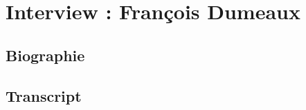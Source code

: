 \chapter{Interview : François Dumeaux}
\label{appendix:dumeaux}

\section*{Biographie}


\section*{Transcript}
